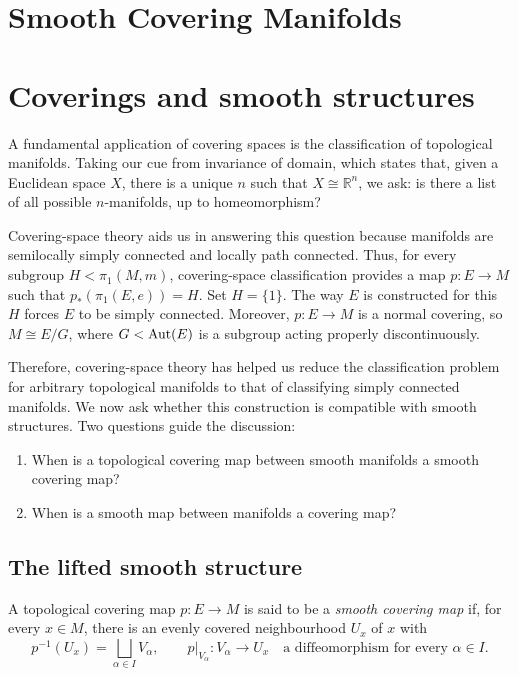 \documentclass[11pt,a4paper]{article}
\begin{document}
\section*{Smooth Covering Manifolds}
\section{Coverings and smooth structures}
A fundamental application of covering spaces is the classification of topological manifolds. Taking our cue from invariance of domain, which states that, given a Euclidean space $X$, there is a unique $n$ such that $X\cong\mathbb R^n$, we ask: is there a list of all possible $n$-manifolds, up to homeomorphism?

Covering-space theory aids us in answering this question because manifolds are semilocally simply connected and locally path connected. Thus, for every subgroup $H<\pi_1(M,m)$, covering-space classification provides a map $p:E\to M$ such that $p_*(\pi_1(E,e))=H$. Set $H=\{1\}$. The way $E$ is constructed for this $H$ forces $E$ to be simply connected. Moreover, $p:E\to M$ is a normal covering, so $M\cong E/G$, where $G<\operatorname{Aut}(E)$ is a subgroup acting properly discontinuously.

Therefore, covering-space theory has helped us reduce the classification problem for arbitrary topological manifolds to that of classifying simply connected manifolds. We now ask whether this construction is compatible with smooth structures. Two questions guide the discussion:
\begin{enumerate}[label=Q\arabic*.]
 \setcounter{enumi}{0}\item When is a topological covering map between smooth manifolds a smooth covering map?
 \setcounter{enumi}{1}\item When is a smooth map between manifolds a covering map?
\end{enumerate}

\subsection{The lifted smooth structure}
\setcounter{definition}{0}\begin{definition}
A topological covering map $p:E\to M$ is said to be a \emph{smooth covering map} if, for every $x\in M$, there is an evenly covered neighbourhood $U_x$ of $x$ with
\[
 p^{-1}(U_x)=\bigsqcup_{\alpha\in I}V_\alpha,
 \qquad p|_{V_\alpha}:V_\alpha\longrightarrow U_x
 \quad\text{a diffeomorphism for every }\alpha\in I.
\]
\end{definition}
\end{document}

